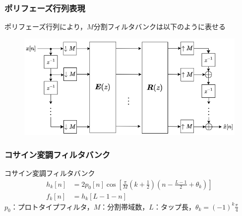 \documentclass[17pt,xcolor=dvipsnames,table,dvipdfmx]{beamer}
\begin{document}
\begin{frame}[c]
    \frametitle{ポリフェーズ行列表現}
    ポリフェーズ行列により，$M$分割フィルタバンクは以下のように表せる
    \vspace{-13pt}
    \begin{figure}
        \includegraphics[width=120mm]{./figs/polyphase_representation_filter_bank.drawio.png}
    \end{figure}
\end{frame}

\begin{frame}[c]
    \frametitle{コサイン変調フィルタバンク}
    \begin{block}{コサイン変調フィルタバンク}
        \small
        \begin{align}
            h_{k}[n] &= 2 p_{0}[n] \cos \left[ \frac{\pi}{M} \left( k + \frac{1}{2} \right) \left( n - \frac{L - 1}{2} + \theta_{k} \right) \right] \\
            f_{k}[n] &= h_{k}[L - 1 - n] \label{eq:cos_modulated_synthesis_filter}
        \end{align}
        $p_{0}$：プロトタイプフィルタ，$M$：分割帯域数，$L$：タップ長，$\theta_{k} = (-1)^{k} \frac{\pi}{4}$
    \end{block}
\end{frame}
\end{document}
